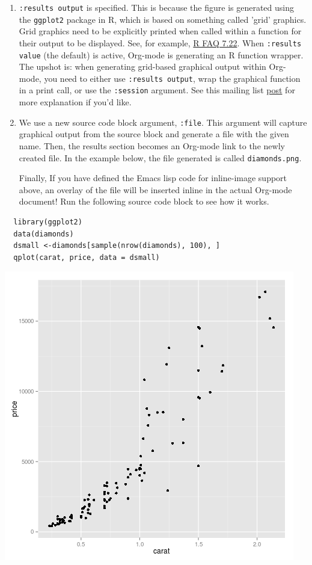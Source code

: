\documentclass[11pt]{article}
\begin{document}
\begin{enumerate}
\item \texttt{:results output} is specified. This is because the figure is generated using the \texttt{ggplot2} package in R, which is based on something called 'grid' graphics. Grid graphics need to be explicitly printed when called within a function for their output to be displayed. See, for example, \href{http://cran.r-project.org/doc/FAQ/R-FAQ.html#Why-do-lattice_002ftrellis-graphics-not-work_003f}{R FAQ 7.22}. When \texttt{:results value} (the default) is active, Org-mode is generating an R function wrapper. The upshot is: when generating grid-based graphical output within Org-mode, you need to either use \texttt{:results output}, wrap the graphical function in a print call, or use the \texttt{:session} argument. See this mailing list \href{http://www.mail-archive.com/emacs-orgmode@gnu.org/msg25944.html}{post} for more explanation if you'd like.

\item We use a new source code block argument, \texttt{:file}. This argument will capture graphical output from the source block and generate a file with the given name. Then, the results section becomes an Org-mode link to the newly created file. In the example below, the file generated is called \texttt{diamonds.png}.

Finally, If you have defined the Emacs lisp code for inline-image support above, an overlay of the file will be inserted inline in the actual Org-mode document! Run the following source code block to see how it works.
\end{enumerate}

\begin{verbatim}
  library(ggplot2)
  data(diamonds)
  dsmall <-diamonds[sample(nrow(diamonds), 100), ] 
  qplot(carat, price, data = dsmall)
\end{verbatim}

\includegraphics[width=.9\linewidth]{diamonds.png}
\end{document}
